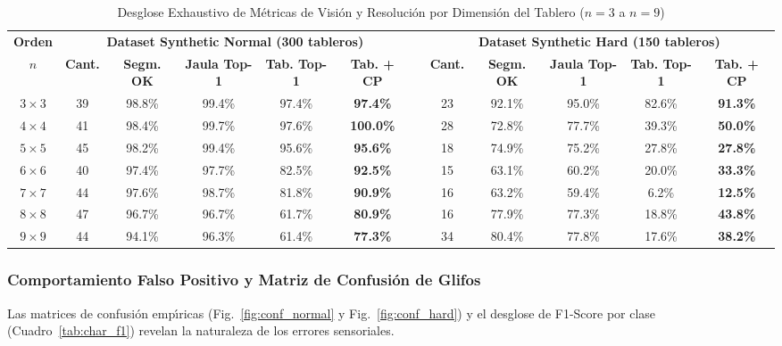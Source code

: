 \begin{table}[t]
\caption{Desglose Exhaustivo de M\'etricas de Visi\'on y Resoluci\'on por Dimensi\'on del Tablero \texorpdfstring{($n=3$ a $n=9$)}{(n=3 a n=9)}}
\label{tab:dim_breakdown}
\centering
\footnotesize
\setlength{\tabcolsep}{2.5pt}
\begin{tabular}{@{}cccccccccccc@{}}
\toprule
\textbf{Orden} & \multicolumn{5}{c}{\textbf{Dataset Synthetic Normal (300 tableros)}} & & \multicolumn{5}{c}{\textbf{Dataset Synthetic Hard (150 tableros)}} \\
\cmidrule(lr){2-6} \cmidrule(lr){8-12}
$n$ & \textbf{Cant.} & \textbf{Segm. OK} & \textbf{Jaula Top-1} & \textbf{Tab. Top-1} & \textbf{Tab. + CP} & & \textbf{Cant.} & \textbf{Segm. OK} & \textbf{Jaula Top-1} & \textbf{Tab. Top-1} & \textbf{Tab. + CP} \\
\midrule
$3 \times 3$ & 39 & 98.8\% & 99.4\% & 97.4\% & \textbf{97.4\%} & & 23 & 92.1\% & 95.0\% & 82.6\% & \textbf{91.3\%} \\
$4 \times 4$ & 41 & 98.4\% & 99.7\% & 97.6\% & \textbf{100.0\%} & & 28 & 72.8\% & 77.7\% & 39.3\% & \textbf{50.0\%} \\
$5 \times 5$ & 45 & 98.2\% & 99.4\% & 95.6\% & \textbf{95.6\%} & & 18 & 74.9\% & 75.2\% & 27.8\% & \textbf{27.8\%} \\
$6 \times 6$ & 40 & 97.4\% & 97.7\% & 82.5\% & \textbf{92.5\%} & & 15 & 63.1\% & 60.2\% & 20.0\% & \textbf{33.3\%} \\
$7 \times 7$ & 44 & 97.6\% & 98.7\% & 81.8\% & \textbf{90.9\%} & & 16 & 63.2\% & 59.4\% & 6.2\% & \textbf{12.5\%} \\
$8 \times 8$ & 47 & 96.7\% & 96.7\% & 61.7\% & \textbf{80.9\%} & & 16 & 77.9\% & 77.3\% & 18.8\% & \textbf{43.8\%} \\
$9 \times 9$ & 44 & 94.1\% & 96.3\% & 61.4\% & \textbf{77.3\%} & & 34 & 80.4\% & 77.8\% & 17.6\% & \textbf{38.2\%} \\
\bottomrule
\end{tabular}
\end{table}

\subsubsection{Comportamiento Falso Positivo y Matriz de Confusi\'on de Glifos}
Las matrices de confusi\'on emp\'{\i}ricas (Fig.~\ref{fig:conf_normal} y Fig.~\ref{fig:conf_hard}) y el desglose de F1-Score por clase (Cuadro~\ref{tab:char_f1}) revelan la naturaleza de los errores sensoriales.

